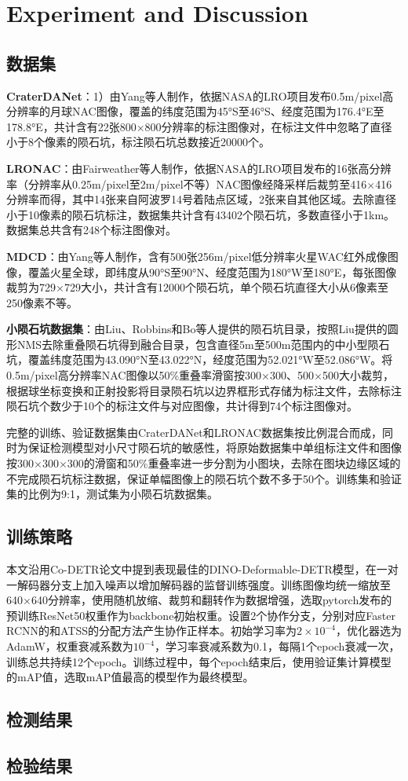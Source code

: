 \section{Experiment and Discussion}
\label{sec:experiment and discussion}
\subsection{数据集}
\textbf{CraterDANet}：1）由Yang\cite{yangCraterDANetConvolutionalNeural2022}等人制作，依据NASA的LRO项目发布0.5m/pixel高分辨率的月球NAC图像，覆盖的纬度范围为45°S至46°S、经度范围为176.4°E至178.8°E，共计含有22张800×800分辨率的标注图像对，在标注文件中忽略了直径小于8个像素的陨石坑，标注陨石坑总数接近20000个。
\par\textbf{LRONAC}：由Fairweather\cite{fairweatherAutomaticMappingSmall2022}等人制作，依据NASA的LRO项目发布的16张高分辨率（分辨率从0.25m/pixel至2m/pixel不等）NAC图像经降采样后裁剪至416$\times$416分辨率而得，其中14张来自阿波罗14号着陆点区域，2张来自其他区域。去除直径小于10像素的陨石坑标注，数据集共计含有43402个陨石坑，多数直径小于1km。数据集总共含有248个标注图像对。
\par\textbf{MDCD}：由Yang\cite{yangHighresolutionFeaturePyramid2022}等人制作，含有500张256m/pixel低分辨率火星WAC红外成像图像，覆盖火星全球，即纬度从90°S至90°N、经度范围为180°W至180°E，每张图像裁剪为729×729大小，共计含有12000个陨石坑，单个陨石坑直径大小从6像素至250像素不等。
\par\textbf{小陨石坑数据集}：由Liu\cite{liuIdentificationLunarCraters2024}、Robbins\cite{robbinsNewGlobalDatabase2019}和Bo\cite{boCatalogueMeterscaleImpact2022}等人提供的陨石坑目录，按照Liu\cite{liuIdentificationLunarCraters2024}提供的圆形NMS去除重叠陨石坑得到融合目录，包含直径5m至500m范围内的中小型陨石坑，覆盖纬度范围为43.090°N至43.022°N，经度范围为52.021°W至52.086°W。将0.5m/pixel高分辨率NAC图像以50\%重叠率滑窗按300×300、500×500大小裁剪，根据球坐标变换和正射投影将目录陨石坑以边界框形式存储为标注文件，去除标注陨石坑个数少于10个的标注文件与对应图像，共计得到74个标注图像对。\par
完整的训练、验证数据集由CraterDANet和LRONAC数据集按比例混合而成，同时为保证检测模型对小尺寸陨石坑的敏感性，将原始数据集中单组标注文件和图像按300$\times$300$\times$300的滑窗和50\%重叠率进一步分割为小图块，去除在图块边缘区域的不完成陨石坑标注数据，保证单幅图像上的陨石坑个数不多于50个。训练集和验证集的比例为9:1，测试集为小陨石坑数据集。
\subsection{训练策略}
本文沿用Co-DETR\cite{zongDETRsCollaborativeHybrid2023}论文中提到表现最佳的DINO-Deformable-DETR模型，在一对一解码器分支上加入噪声以增加解码器的监督训练强度。训练图像均统一缩放至640$\times$640分辨率，使用随机放缩、裁剪和翻转作为数据增强，选取pytorch发布的预训练ResNet50权重作为backbone初始权重。设置2个协作分支，分别对应Faster RCNN\cite{renFasterRCNNRealtime2015}的和ATSS\cite{zhangBridgingGapAnchorbased2020}的分配方法产生协作正样本。初始学习率为$2\times10^{-4}$，优化器选为AdamW，权重衰减系数为$10^{-4}$，学习率衰减系数为0.1，每隔1个epoch衰减一次，训练总共持续12个epoch。训练过程中，每个epoch结束后，使用验证集计算模型的mAP值，选取mAP值最高的模型作为最终模型。
\subsection{检测结果}
\subsection{检验结果}